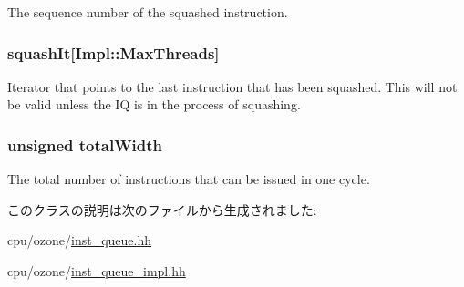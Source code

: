 \label{classInstQueue_a97d5a7e4630ad1d017909f7504b9ec32}
The sequence number of the squashed instruction. \hypertarget{classInstQueue_a76b506d03788e72757da427226e10356}{
\subsubsection[{squashIt}]{ {\bf squashIt}\mbox{[}Impl::MaxThreads\mbox{]}}}
\label{classInstQueue_a76b506d03788e72757da427226e10356}
Iterator that points to the last instruction that has been squashed. This will not be valid unless the IQ is in the process of squashing. \hypertarget{classInstQueue_ab3c3a8cd00248d9cd6acad330da902a7}{
\subsubsection[{totalWidth}]{\setlength{\rightskip}{0pt plus 5cm}unsigned {\bf totalWidth}}}
\label{classInstQueue_ab3c3a8cd00248d9cd6acad330da902a7}
The total number of instructions that can be issued in one cycle. 

このクラスの説明は次のファイルから生成されました:\begin{DoxyCompactItemize}
\item 
cpu/ozone/\hyperlink{ozone_2inst__queue_8hh}{inst\_\-queue.hh}\item 
cpu/ozone/\hyperlink{ozone_2inst__queue__impl_8hh}{inst\_\-queue\_\-impl.hh}\end{DoxyCompactItemize}
